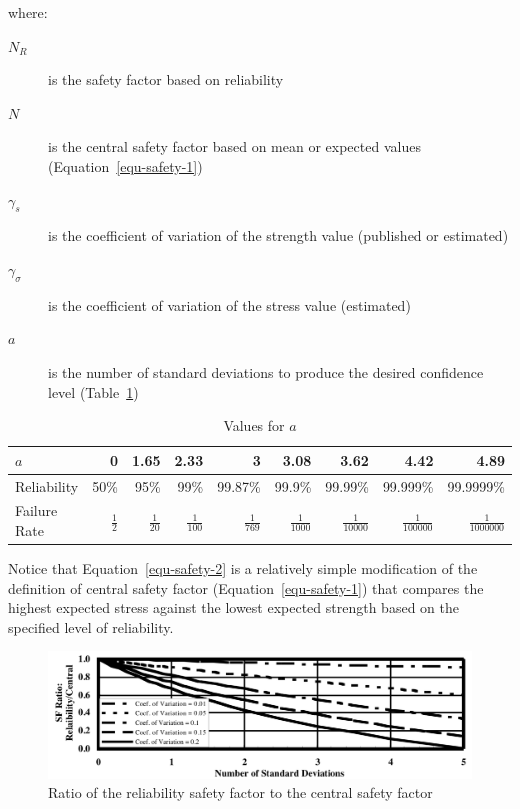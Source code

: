 \noindent where:

\begin{description}
  \item[$N_R$] is the safety factor based on reliability
  \item[$N$] is the central safety factor based on mean or expected values (Equation~\ref{equ-safety-1})
  \item[$\gamma_s$] is the coefficient of variation of the strength value (published or estimated)
  \item[$\gamma_\sigma$] is the coefficient of variation of the stress value (estimated)
  \item[$a$] is the number of standard deviations to produce the desired confidence level (Table~\ref{tbl-a})
\end{description}

\begin{table}
  \center{}
  \small
  \begin{tabular}{l r r r r r r r r}
    \toprule
    $a$ & 0 & 1.65 & 2.33 & 3 & 3.08 & 3.62 & 4.42 & 4.89 \\
    \midrule
    Reliability & 50\% & 95\% & 99\% & 99.87\% & 99.9\% & 99.99\% & 99.999\% & 99.9999\% \\
    Failure Rate & $\frac{1}{2}$ & $\frac{1}{20}$ & $\frac{1}{100}$ & $\frac{1}{769}$ & $\frac{1}{1000}$ & $\frac{1}{10000}$ & $\frac{1}{100000}$ & $\frac{1}{1000000}$ \\
    \bottomrule
  \end{tabular}
  \vspace{2em}
  \caption{Values for $a$}
  \label{tbl-a}
\end{table}

Notice that Equation~\ref{equ-safety-2} is a relatively simple modification of the definition of central safety factor (Equation~\ref{equ-safety-1}) that compares the highest expected stress against the lowest expected strength based on the specified level of reliability.

\begin{figure}
  \centering
  \includegraphics[width=\textwidth]{figs/sf-ratio.png}
  \caption{Ratio of the reliability safety factor to the central safety factor}
\end{figure}

